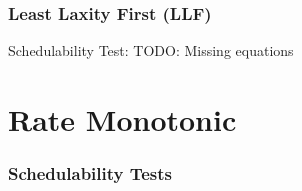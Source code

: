 \documentclass[xcolor=table]{beamer}
\begin{document}
\begin{frame}
\frametitle{Least Laxity First (\textbf{LLF})}

\begin{block}{Schedulability Test:}
TODO: Missing equations
\end{block}

\end{frame}

\section{Rate Monotonic}

\begin{frame}
\frametitle{Schedulability Tests}

\end{frame}
\end{document}

